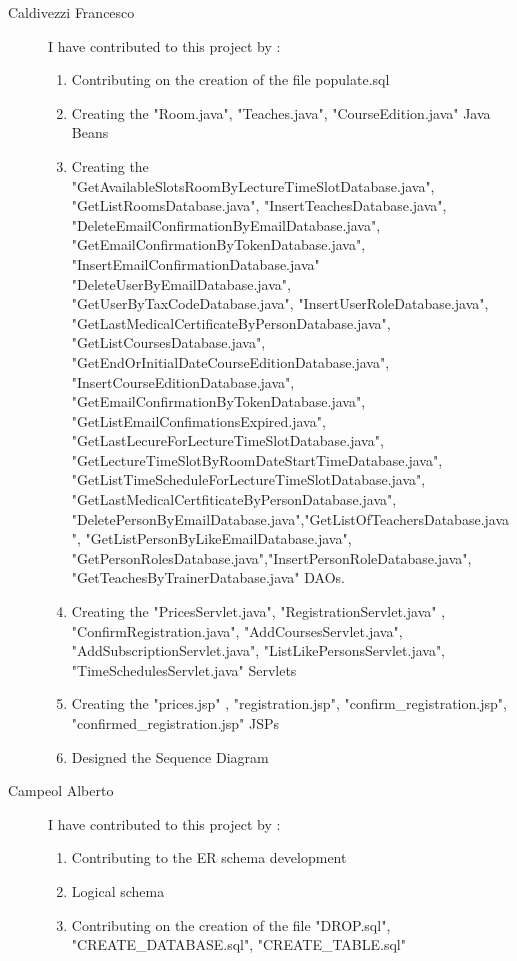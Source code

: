 \begin{description}
	\item[Caldivezzi Francesco] I have contributed to this project by :
		\begin{flushleft}
			\begin{enumerate}
				\item Contributing on the creation of the file populate.sql
				\item Creating the "Room.java", "Teaches.java", "CourseEdition.java" Java Beans
				\item Creating the "GetAvailableSlotsRoomByLectureTimeSlotDatabase.java", "GetListRoomsDatabase.java", "InsertTeachesDatabase.java", 	"DeleteEmailConfirmationByEmailDatabase.java", "GetEmailConfirmationByTokenDatabase.java", "InsertEmailConfirmationDatabase.java" "DeleteUserByEmailDatabase.java", "GetUserByTaxCodeDatabase.java", "InsertUserRoleDatabase.java", "GetLastMedicalCertificateByPersonDatabase.java", "GetListCoursesDatabase.java", "GetEndOrInitialDateCourseEditionDatabase.java",  "InsertCourseEditionDatabase.java", "GetEmailConfirmationByTokenDatabase.java", "GetListEmailConfimationsExpired.java", "GetLastLecureForLectureTimeSlotDatabase.java", "GetLectureTimeSlotByRoomDateStartTimeDatabase.java", "GetListTimeScheduleForLectureTimeSlotDatabase.java", "GetLastMedicalCertfiticateByPersonDatabase.java", "DeletePersonByEmailDatabase.java","GetListOfTeachersDatabase.java", "GetListPersonByLikeEmailDatabase.java", "GetPersonRolesDatabase.java","InsertPersonRoleDatabase.java", "GetTeachesByTrainerDatabase.java" DAOs.
				\item Creating the "PricesServlet.java", "RegistrationServlet.java" , "ConfirmRegistration.java", "AddCoursesServlet.java", "AddSubscriptionServlet.java", "ListLikePersonsServlet.java", "TimeSchedulesServlet.java" Servlets
				\item Creating the "prices.jsp" , "registration.jsp", "confirm\_registration.jsp", "confirmed\_registration.jsp" JSPs	
				\item Designed the Sequence Diagram			 		
			\end{enumerate}
		\end{flushleft}
	\item[Campeol Alberto] I have contributed to this project by :
	\begin{flushleft}
		\begin{enumerate}
			\item Contributing to the ER schema development
			\item Logical schema
			\item Contributing on the creation of the file "DROP.sql", "CREATE\_DATABASE.sql", "CREATE\_TABLE.sql"

\end{enumerate}
\end{flushleft}
\end{description}
